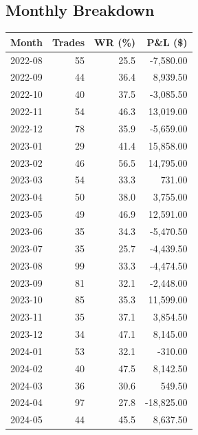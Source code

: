 \documentclass[11pt,a4paper,twoside]{article}
\begin{document}
\subsection{Monthly Breakdown}
\noindent\begin{center}
\begin{tabular}{>{\color{txtmain}}l rrr}
\toprule
\rowcolor{cardbg}
\textbf{Month} & \textbf{Trades} & \textbf{WR (\%)} & \textbf{P\&L (\$)} \\
\midrule
2022-08 & 55 & 25.5 & \textcolor{lossred}{-7,580.00} \\
2022-09 & 44 & 36.4 & \textcolor{wingreen}{8,939.50} \\
2022-10 & 40 & 37.5 & \textcolor{lossred}{-3,085.50} \\
2022-11 & 54 & 46.3 & \textcolor{wingreen}{13,019.00} \\
2022-12 & 78 & 35.9 & \textcolor{lossred}{-5,659.00} \\
2023-01 & 29 & 41.4 & \textcolor{wingreen}{15,858.00} \\
2023-02 & 46 & 56.5 & \textcolor{wingreen}{14,795.00} \\
2023-03 & 54 & 33.3 & \textcolor{wingreen}{731.00} \\
2023-04 & 50 & 38.0 & \textcolor{wingreen}{3,755.00} \\
2023-05 & 49 & 46.9 & \textcolor{wingreen}{12,591.00} \\
2023-06 & 35 & 34.3 & \textcolor{lossred}{-5,470.50} \\
2023-07 & 35 & 25.7 & \textcolor{lossred}{-4,439.50} \\
2023-08 & 99 & 33.3 & \textcolor{lossred}{-4,474.50} \\
2023-09 & 81 & 32.1 & \textcolor{lossred}{-2,448.00} \\
2023-10 & 85 & 35.3 & \textcolor{wingreen}{11,599.00} \\
2023-11 & 35 & 37.1 & \textcolor{wingreen}{3,854.50} \\
2023-12 & 34 & 47.1 & \textcolor{wingreen}{8,145.00} \\
2024-01 & 53 & 32.1 & \textcolor{lossred}{-310.00} \\
2024-02 & 40 & 47.5 & \textcolor{wingreen}{8,142.50} \\
2024-03 & 36 & 30.6 & \textcolor{wingreen}{549.50} \\
2024-04 & 97 & 27.8 & \textcolor{lossred}{-18,825.00} \\
2024-05 & 44 & 45.5 & \textcolor{wingreen}{8,637.50} \\

\end{tabular}
\end{center}
\end{document}
